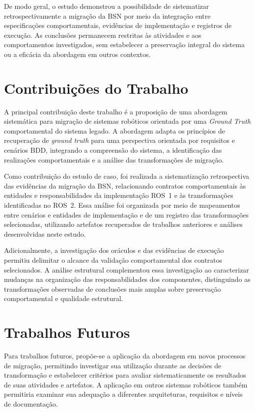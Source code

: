 De modo geral, o estudo demonstrou a possibilidade de sistematizar retrospectivamente a migração da BSN por meio da integração entre especificações comportamentais, evidências de implementação e registros de execução. As conclusões permanecem restritas às atividades e aos comportamentos investigados, sem estabelecer a preservação integral do sistema ou a eficácia da abordagem em outros contextos.
\section{Contribuições do Trabalho}

A principal contribuição deste trabalho é a proposição de uma abordagem sistemática para migração de sistemas robóticos orientada por uma \textit{Ground Truth} comportamental do sistema legado. A abordagem adapta os princípios de recuperação de \textit{ground truth} para uma perspectiva orientada por requisitos e cenários BDD, integrando a compreensão do sistema, a identificação das realizações comportamentais e a análise das transformações de migração.

Como contribuição do estudo de caso, foi realizada a sistematização retrospectiva das evidências da migração da BSN, relacionando contratos
comportamentais às entidades e responsabilidades da implementação ROS~1 e às transformações identificadas no ROS~2. Essa análise foi organizada por meio de mapeamentos entre cenários e entidades de implementação e de um registro das transformações selecionadas, utilizando artefatos recuperados de trabalhos anteriores e análises desenvolvidas neste estudo.

Adicionalmente, a investigação dos oráculos e das evidências de execução permitiu delimitar o alcance da validação comportamental dos contratos selecionados. A análise estrutural complementou essa investigação ao caracterizar mudanças na organização das responsabilidades dos componentes, distinguindo as transformações observadas de conclusões mais amplas sobre preservação comportamental e qualidade estrutural.

\section{Trabalhos Futuros}

Para trabalhos futuros, propõe-se a aplicação da abordagem em novos processos de migração, permitindo investigar sua utilização durante as decisões de transformação e estabelecer critérios para avaliar sistematicamente os resultados de suas atividades e artefatos. A aplicação em outros sistemas robóticos também permitiria examinar sua adequação a diferentes arquiteturas, requisitos e níveis de documentação.

